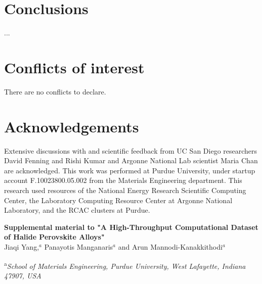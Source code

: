 \documentclass[twoside,twocolumn,9pt]{article}
\begin{document}
\section*{Conclusions}

... \\


\section*{Conflicts of interest}
There are no conflicts to declare.

\section*{Acknowledgements}
Extensive discussions with and scientific feedback from UC San Diego researchers David Fenning and Rishi Kumar and Argonne National Lab scientist Maria Chan are acknowledged. This work was performed at Purdue University, under startup account F.10023800.05.002 from the Materials Engineering department. This research used resources of the National Energy Research Scientific Computing Center, the Laboratory Computing Resource Center at Argonne National Laboratory, and the RCAC clusters at Purdue.


\balance







\clearpage
\newpage
\setcounter{page}{1}


\setcounter{figure}{0}   
\setcounter{table}{0} 
\renewcommand{\thetable}{S\Roman{table}} 
\renewcommand\thefigure{S\arabic{figure}}
 
\begin{center}
\vspace*{0.5cm}
\Large
\textbf{Supplemental material to "A High-Throughput Computational Dataset of Halide Perovskite Alloys"\\}
\vspace{0.5cm}
\large
Jiaqi Yang,\textit{$^{a}$} Panayotis Manganaris\textit{$^{a}$} and Arun Mannodi-Kanakkithodi\textit{$^{a}$} \\
\vspace{0.3cm}

\normalsize
\textsuperscript{a}\textit{School of Materials Engineering, Purdue University, West Lafayette, Indiana 47907, USA} \\
\end{center}
\end{document}
